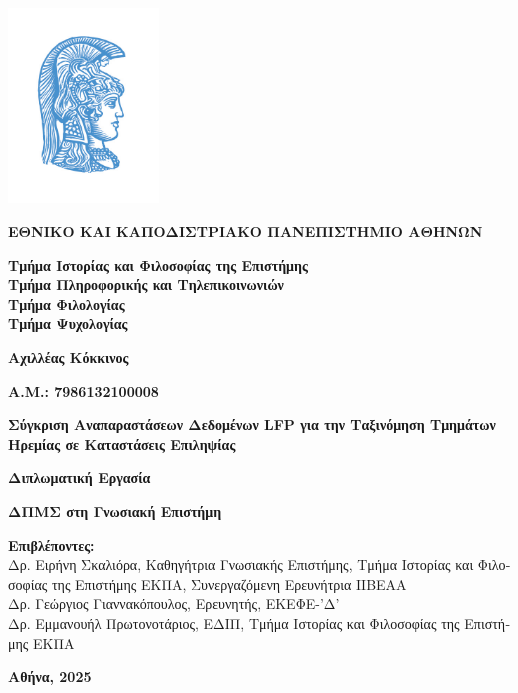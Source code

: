 \documentclass{article}
\begin{document}
\begin{greek}
\begin{titlepage}
	\centering
	\includegraphics[width=0.3\textwidth]{LOGO_UOA COL2.jpg}\\
	\vspace*{1cm}
	
	\textbf{\LARGE ΕΘΝΙΚΟ ΚΑΙ ΚΑΠΟΔΙΣΤΡΙΑΚΟ ΠΑΝΕΠΙΣΤΗΜΙΟ ΑΘΗΝΩΝ}
	
	\vspace{1cm}
	
	\textbf{Τμήμα Ιστορίας και Φιλοσοφίας της Επιστήμης}\\
	\textbf{Τμήμα Πληροφορικής και Τηλεπικοινωνιών}\\
	\textbf{Τμήμα Φιλολογίας}\\
	\textbf{Τμήμα Ψυχολογίας}
	
	\vspace{1cm}
	
	\textbf{\Large Αχιλλέας Κόκκινος}
	
	\vfill
	
	\textbf{\Large Α.Μ.: 7986132100008}
	
	\vfill
	
	{\huge \textbf{Σύγκριση Αναπαραστάσεων Δεδομένων LFP για την Ταξινόμηση Τμημάτων Ηρεμίας σε Καταστάσεις Επιληψίας}}
	
	\vfill
	
	\textbf{\Large Διπλωματική Εργασία}
	
	\vfill
	
	\textbf{\Large ΔΠΜΣ στη Γνωσιακή Επιστήμη}
	
	\vfill
	
	\textbf{Επιβλέποντες:}\\
	Δρ. Ειρήνη Σκαλιόρα, Καθηγήτρια Γνωσιακής Επιστήμης, Τμήμα Ιστορίας και Φιλοσοφίας της Επιστήμης ΕΚΠΑ, Συνεργαζόμενη Ερευνήτρια ΙΙΒΕΑΑ\\
	Δρ. Γεώργιος Γιαννακόπουλος, Ερευνητής, ΕΚΕΦΕ-’Δ’\\
	Δρ. Εμμανουήλ Πρωτονοτάριος, ΕΔΙΠ, Τμήμα Ιστορίας και Φιλοσοφίας της Επιστήμης ΕΚΠΑ
	
	\vfill
	\textbf{Αθήνα, 2025}
	
\end{titlepage}
\end{greek}
\end{document}
